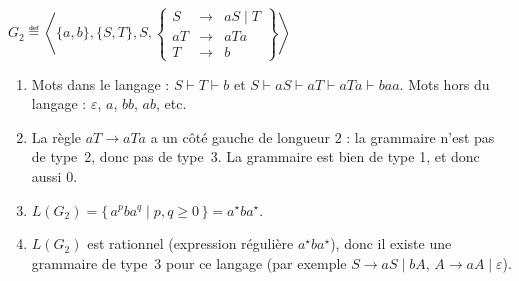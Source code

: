 \begin{exercice}
  \begin{questions}
  \item $G_2 \eqdef \left\langle \{a, b\}, \{S, T\}, S,
    \left\{\begin{array}{rcl}
    S &\rightarrow& a S \mid T\\
    a T &\rightarrow& a T a \\
    T &\rightarrow& b
    \end{array}\right\}  \right\rangle$
  \end{questions}
  \begin{corrections}
    \begin{enumerate}
    \item Mots dans le langage :
      $S \vdash T \vdash b$ et 
      $S \vdash aS \vdash aT \vdash aTa \vdash ba a$.
      Mots hors du langage : $\varepsilon$, $a$, $bb$, $ab$, etc.  
    \item
      La règle $aT \to aTa$ a un côté gauche de longueur $2$ : la grammaire n'est pas de type~2, donc pas de type~3.  
      La grammaire est bien de type 1, et donc aussi 0. 
    \item $L(G_2) = \{\, a^p b a^q \mid p,q \ge 0 \,\} = a^\star b a^\star$.
    \item $L(G_2)$ est rationnel (expression régulière $a^\star b a^\star$), donc il existe une grammaire de type~3
      pour ce langage (par exemple $S \to aS \mid bA$, $A \to aA \mid \varepsilon$).  
    \end{enumerate}
  \end{corrections}


\end{exercice}
